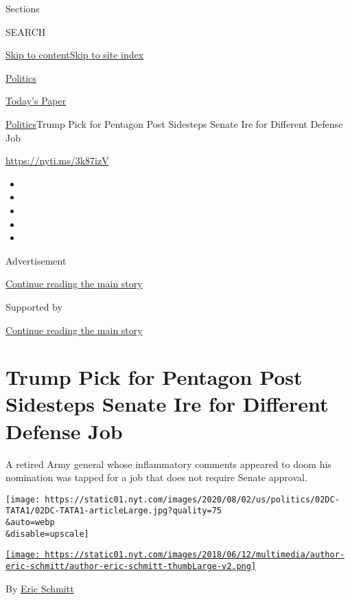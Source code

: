 Sections

SEARCH

\protect\hyperlink{site-content}{Skip to
content}\protect\hyperlink{site-index}{Skip to site index}

\href{https://www.nytimes.com/section/politics}{Politics}

\href{https://myaccount.nytimes.com/auth/login?response_type=cookie\&client_id=vi}{}

\href{https://www.nytimes.com/section/todayspaper}{Today's Paper}

\href{/section/politics}{Politics}\textbar{}Trump Pick for Pentagon Post
Sidesteps Senate Ire for Different Defense Job

\url{https://nyti.ms/3k87izV}

\begin{itemize}
\item
\item
\item
\item
\item
\end{itemize}

Advertisement

\protect\hyperlink{after-top}{Continue reading the main story}

Supported by

\protect\hyperlink{after-sponsor}{Continue reading the main story}

\hypertarget{trump-pick-for-pentagon-post-sidesteps-senate-ire-for-different-defense-job}{%
\section{Trump Pick for Pentagon Post Sidesteps Senate Ire for Different
Defense
Job}\label{trump-pick-for-pentagon-post-sidesteps-senate-ire-for-different-defense-job}}

A retired Army general whose inflammatory comments appeared to doom his
nomination was tapped for a job that does not require Senate approval.

\texttt{[image: https://static01.nyt.com/images/2020/08/02/us/politics/02DC-TATA1/02DC-TATA1-articleLarge.jpg?quality=75\\\&auto=webp\\\&disable=upscale]}

\href{https://www.nytimes.com/by/eric-schmitt}{\texttt{[image: https://static01.nyt.com/images/2018/06/12/multimedia/author-eric-schmitt/author-eric-schmitt-thumbLarge-v2.png]}}

By \href{https://www.nytimes.com/by/eric-schmitt}{Eric Schmitt}

